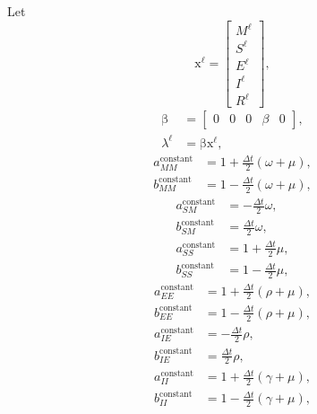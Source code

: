 \documentclass{jpmarticle}
\renewcommand{\vec}[1]{\boldsymbol{\mathrm{#1}}}
\begin{document}
Let
\begin{equation}
  \vec{x}^{\ell} =
  \begin{bmatrix}
    M^{\ell} \\ S^{\ell} \\ E^{\ell} \\ I^{\ell} \\ R^{\ell}
  \end{bmatrix},
\end{equation}
\begin{equation}
  \begin{split}
    \vec{\beta} &=
    \begin{bmatrix}
      0 & 0 & 0 & \beta & 0
    \end{bmatrix},
    \\
    \lambda^{\ell} &=
    \vec{\beta} \vec{x}^{\ell},
  \end{split}
\end{equation}
\begin{equation}
  \begin{split}
    a_{MM}^{\text{constant}} &=
    1 + \frac{\Delta t}{2} (\omega + \mu),
    \\
    b_{MM}^{\text{constant}} &=
    1 - \frac{\Delta t}{2} (\omega + \mu),
  \end{split}
\end{equation}
\begin{equation}
  \begin{split}
    a_{SM}^{\text{constant}} &=
    - \frac{\Delta t}{2} \omega,
    \\
    b_{SM}^{\text{constant}} &=
    \frac{\Delta t}{2} \omega,
    \\
    a_{SS}^{\text{constant}} &=
    1 + \frac{\Delta t}{2} \mu,
    \\
    b_{SS}^{\text{constant}} &=
    1 - \frac{\Delta t}{2} \mu,
  \end{split}
\end{equation}
\begin{equation}
  \begin{split}
    a_{EE}^{\text{constant}} &=
    1 + \frac{\Delta t}{2} (\rho + \mu),
    \\
    b_{EE}^{\text{constant}} &=
    1 - \frac{\Delta t}{2} (\rho + \mu),
  \end{split}
\end{equation}
\begin{equation}
  \begin{split}
    a_{IE}^{\text{constant}} &=
    - \frac{\Delta t}{2} \rho,
    \\
    b_{IE}^{\text{constant}} &=
    \frac{\Delta t}{2} \rho,
    \\
    a_{II}^{\text{constant}} &=
    1 + \frac{\Delta t}{2} (\gamma + \mu),
    \\
    b_{II}^{\text{constant}} &=
    1 - \frac{\Delta t}{2} (\gamma + \mu),
  \end{split}
\end{equation}
\end{document}

